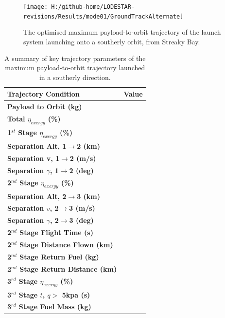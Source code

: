 \begin{figure}[th]
	\centering
	\texttt{[image: H:/github-home/LODESTAR-revisions/Results/mode01/GroundTrackAlternate]}
	\caption{The optimised maximum payload-to-orbit trajectory of the launch system launching onto a southerly orbit, from Streaky Bay.}
	\label{fig:GroundTrackAlternate}
\end{figure}

\begin{table}
	\centering
	\begin{tabular}{l c} 
		\hline \textbf{Trajectory Condition}
		& Value

		\\
		\hline \textbf{Payload to Orbit (kg)}
		& \textbf{\PayloadToOrbitAlternate}
		\\
		\textbf{Total $\eta_{exergy}$ (\%)}
		& \textbf{\totalExergyEffAlternate}
		\\
		\hline 
		\textbf{1$^{st}$ Stage $\eta_{exergy}$ (\%)}
		& \textbf{\firstExergyEffAlternate}
		\\
		\textbf{Separation Alt, 1$\rightarrow$2 (km)}
		& \firstsecondSeparationAltAlternate
		\\
		\textbf{Separation v, 1$\rightarrow$2 (m/s)}
		& \firstsecondSeparationvAlternate
		\\
		\textbf{Separation $\gamma$, 1$\rightarrow$2 (deg)}
		& \firstsecondSeparationgammaAlternate
		\\
		\hline 
		\textbf{2$^{nd}$ Stage $\eta_{exergy}$ (\%)}
		& \textbf{\secondExergyEffAlternate}
		\\
		\textbf{Separation Alt, 2$\rightarrow$3 (km)}
		& \secondthirdSeparationAltAlternate
		\\
		\textbf{Separation $v$, 2$\rightarrow$3 (m/s)}
		& \secondthirdSeparationvAlternate
		\\
		\textbf{Separation $\gamma$, 2$\rightarrow$3 (deg)}
		& \secondthirdSeparationgammaAlternate
		\\
		\textbf{2$^{nd}$ Stage Flight Time (s)}
		& \secondFlightTimeAlternate
		\\
		\textbf{2$^{nd}$ Stage Distance Flown (km)}
		& \SecondDistAlternate
		\\
		\textbf{2$^{nd}$ Stage Return Fuel (kg)}
		& \returnFuelAlternate
		\\
		\textbf{2$^{nd}$ Stage Return Distance (km)}
		& \returnDistAlternate
		\\
		\hline 
		\textbf{3$^{rd}$ Stage $\eta_{exergy}$ (\%)}
		& \textbf{\thirddExergyEffAlternate}
		\\
		\textbf{3$^{rd}$ Stage $t$, $q >$ 5kpa (s)}
		& \thirdqOverFiveAlternate
		\\
		\textbf{3$^{rd}$ Stage Fuel Mass (kg)}
		& \thirdmFuelAlternate
		\\
		\hline 
	\end{tabular} 
	\caption{A summary of key trajectory parameters of the maximum payload-to-orbit trajectory launched in a southerly direction.}
	\label{tab:summaryalternate}
\end{table}




